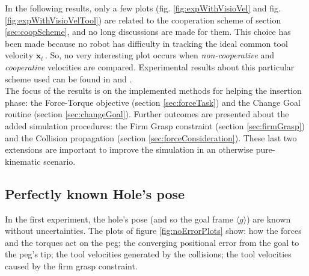 In the following results, only a few plots (fig. \ref{fig:expWithVisioVel} and fig. \ref{fig:expWithVisioVelTool}) are related to the cooperation scheme of section \ref{sec:coopScheme}, and no long discussions are made for them. This choice has been made because no robot has difficulty in tracking the ideal common tool velocity $\dot{\boldsymbol{x}}_t\,$. So, no very interesting plot occurs when \textit{non-cooperative} and \textit{cooperative} velocities are compared. Experimental results about this particular scheme used can be found in \cite{IntroMaris2} and \cite{tesiWander}.\\

The focus of the results is on the implemented methods for helping the insertion phase: the Force-Torque objective (section \ref{sec:forceTask}) and the Change Goal routine (section \ref{sec:changeGoal}). Further outcomes are presented about the added simulation procedures: the Firm Grasp constraint (section \ref{sec:firmGrasp}) and the Collision propagation (section \ref{sec:forceConsideration}). These last two extensions are important to improve the simulation in an otherwise pure-kinematic scenario.

\subsection{Perfectly known Hole's pose}
\label{sec:testPerfectHolePose}
In the first experiment, the hole's pose (and so the goal frame $\langle g \rangle$) are known without uncertainties. The plots of figure \ref{fig:noErrorPlots} show: how the forces and the torques act on the peg; the converging positional error from the goal to the peg's tip; the tool velocities generated by the collisions; the tool velocities caused by the firm grasp constraint.

